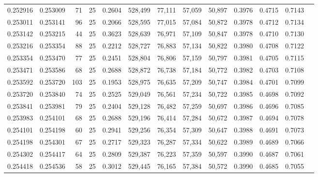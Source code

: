 \begin{tabular}{rrrrrrrrrrrrr}
0.252916 & 0.253009 &    71 &  25 &                                     0.2604 & 528,499 &  77,111 &  57,059 &  50,897 & 0.3976 & 0.4715 & 0.7143 \\
0.253011 & 0.253141 &    96 &  25 &                                     0.2066 & 528,595 &  77,015 &  57,084 &  50,872 & 0.3978 & 0.4712 & 0.7134 \\
0.253142 & 0.253215 &    44 &  25 &                                     0.3623 & 528,639 &  76,971 &  57,109 &  50,847 & 0.3978 & 0.4710 & 0.7130 \\
0.253216 & 0.253354 &    88 &  25 &                                     0.2212 & 528,727 &  76,883 &  57,134 &  50,822 & 0.3980 & 0.4708 & 0.7122 \\
0.253354 & 0.253470 &    77 &  25 &                                     0.2451 & 528,804 &  76,806 &  57,159 &  50,797 & 0.3981 & 0.4705 & 0.7115 \\
0.253471 & 0.253586 &    68 &  25 &                                     0.2688 & 528,872 &  76,738 &  57,184 &  50,772 & 0.3982 & 0.4703 & 0.7108 \\
0.253592 & 0.253720 &   103 &  25 &                                     0.1953 & 528,975 &  76,635 &  57,209 &  50,747 & 0.3984 & 0.4701 & 0.7099 \\
0.253720 & 0.253840 &    74 &  25 &                                     0.2525 & 529,049 &  76,561 &  57,234 &  50,722 & 0.3985 & 0.4698 & 0.7092 \\
0.253841 & 0.253981 &    79 &  25 &                                     0.2404 & 529,128 &  76,482 &  57,259 &  50,697 & 0.3986 & 0.4696 & 0.7085 \\
0.253983 & 0.254101 &    68 &  25 &                                     0.2688 & 529,196 &  76,414 &  57,284 &  50,672 & 0.3987 & 0.4694 & 0.7078 \\
0.254101 & 0.254198 &    60 &  25 &                                     0.2941 & 529,256 &  76,354 &  57,309 &  50,647 & 0.3988 & 0.4691 & 0.7073 \\
0.254198 & 0.254301 &    67 &  25 &                                     0.2717 & 529,323 &  76,287 &  57,334 &  50,622 & 0.3989 & 0.4689 & 0.7066 \\
0.254302 & 0.254417 &    64 &  25 &                                     0.2809 & 529,387 &  76,223 &  57,359 &  50,597 & 0.3990 & 0.4687 & 0.7061 \\
0.254418 & 0.254536 &    58 &  25 &                                     0.3012 & 529,445 &  76,165 &  57,384 &  50,572 & 0.3990 & 0.4685 & 0.7055 \\

\end{tabular}
